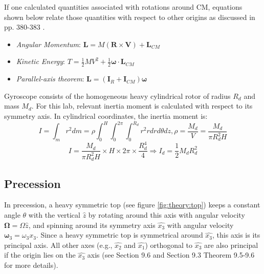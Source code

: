 If one calculated quantities associated with rotations around CM, equations shown below relate those quantities with respect to other origins as discussed in pp. 380-383 \cite{1}.
\begin{itemize}
\item \emph{Angular Momentum}: $\mathbf{L} = M(\mathbf{R} \times \mathbf{V}) + \mathbf{L}_{CM}$
\item \emph{Kinetic Energy}: $T = \frac{1}{2}MV^2 + \frac{1}{2}\boldsymbol\omega \cdot \mathbf{L}_{CM}$
\item \emph{Parallel-axis theorem}: $\mathbf{L} = \left( \mathbf{I}_{R} + \mathbf{I}_{CM} \right) \boldsymbol\omega$
\end{itemize}

Gyroscope consists of the homogeneous heavy cylindrical rotor of radius $R_{d}$ and mass $M_{d}$. For this lab, relevant inertia moment is calculated with respect to its symmetry axis. In cylindrical coordinates, the inertia moment is:
\begin{equation*}
  I = \int_{m}r^{2}dm = \rho\int_{0}^{H} \int_{0}^{2\pi}\int_{0}^{R_d}r^{2} rdrd\theta dz, \rho = \frac{M_{d}}{V} = \frac{M_{d}}{\pi R_{d}^{2} H} 
\end{equation*}
\begin{equation} \label{eq:theory:id}
  I = \frac{M_{d}}{\pi R_{d}^{2} H} \times H \times 2\pi \times \frac{R_{d}^{4}}{4} \Rightarrow I_{d} = \frac{1}{2} M_{d} R_{d}^{2}
\end{equation}

\subsection{Precession}
\label{sec:theory:precession}

In precession, a heavy symmetric top (see figure \ref{fig:theory:top}) keeps a constant angle $\theta$ with the vertical $\hat{z}$ by rotating around this axis with angular velocity $\boldsymbol\Omega = \Omega \hat{z}$, and spinning around its symmetry axis $\hat{x_{3}}$ with angular velocity $\boldsymbol\omega_{3} = \omega_{3} \hat{x_{3}}$. Since a heavy symmetric top is symmetrical around $\hat{x_{3}}$, this axis is its principal axis. All other axes (e.g., $\hat{x_{2}}$ and $\hat{x_{1}}$) orthogonal to $\hat{x_{3}}$ are also principal if the origin lies on the $\hat{x_{3}}$ axis (see Section 9.6 and Section 9.3 Theorem 9.5-9.6 \cite{1} for more details).

